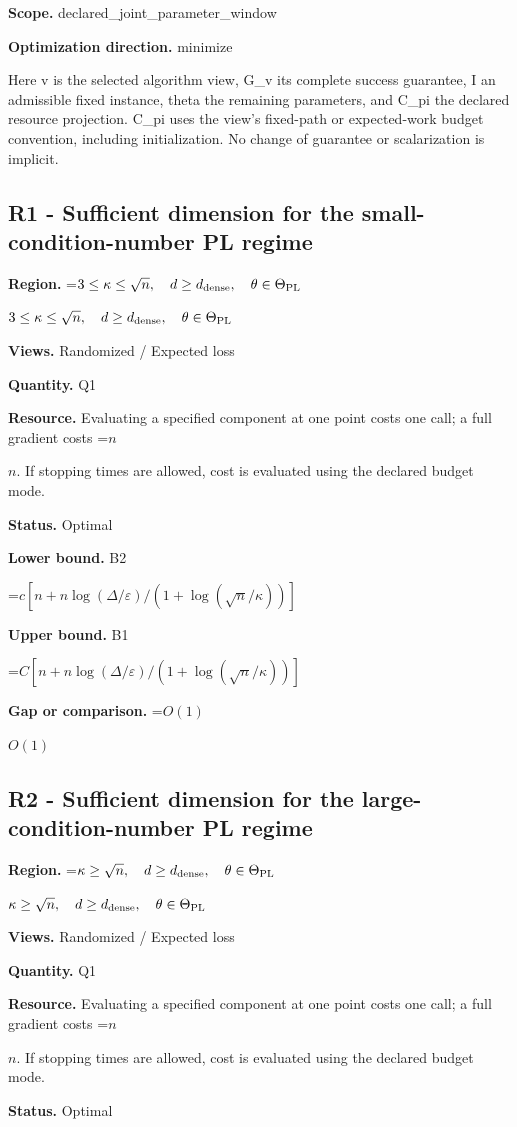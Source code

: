 \documentclass[10pt,a4paper]{article}
\newcommand{\AtlasMath}[1]{\par\begingroup\centering\setbox0=\hbox{$\displaystyle #1$}\ifdim\wd0>1.4\linewidth\typeout{ATLAS WIDE FORMULA: \the\wd0}\fi\ifdim\wd0>\linewidth\resizebox{\linewidth}{!}{\box0}\else\box0\fi\par\endgroup}
\newcommand{\AtlasInlineMath}[1]{\begingroup\setbox0=\hbox{$#1$}\ifdim\wd0>.4\linewidth\endgroup\AtlasMath{#1}\else\endgroup$#1$\fi}
\begin{document}
\textbf{Scope.} declared\_joint\_parameter\_window

\textbf{Optimization direction.} minimize

Here v is the selected algorithm view, G\_v its complete success guarantee, I an admissible fixed instance, theta the remaining parameters, and C\_pi the declared resource projection. C\_pi uses the view's fixed-path or expected-work budget convention, including initialization. No change of guarantee or scalarization is implicit.

\subsection{R1 - Sufficient dimension for the small-condition-number PL regime}
\textbf{Region.} \AtlasInlineMath{3\le\kappa\le\sqrt n,\quad d\ge d_{\rm dense},\quad\theta\in\Theta_{\rm PL}}

\textbf{Views.} Randomized / Expected loss

\textbf{Quantity.} Q1

\textbf{Resource.} Evaluating a specified component at one point costs one call; a full gradient costs \AtlasInlineMath{n}. If stopping times are allowed, cost is evaluated using the declared budget mode.

\textbf{Status.} Optimal

\textbf{Lower bound.} B2

\AtlasMath{c[n+n\log(\Delta/\varepsilon)/(1+\log(\sqrt n/\kappa))]}
\textbf{Upper bound.} B1

\AtlasMath{C[n+n\log(\Delta/\varepsilon)/(1+\log(\sqrt n/\kappa))]}
\textbf{Gap or comparison.} \AtlasInlineMath{O(1)}

\subsection{R2 - Sufficient dimension for the large-condition-number PL regime}
\textbf{Region.} \AtlasInlineMath{\kappa\ge\sqrt n,\quad d\ge d_{\rm dense},\quad\theta\in\Theta_{\rm PL}}

\textbf{Views.} Randomized / Expected loss

\textbf{Quantity.} Q1

\textbf{Resource.} Evaluating a specified component at one point costs one call; a full gradient costs \AtlasInlineMath{n}. If stopping times are allowed, cost is evaluated using the declared budget mode.

\textbf{Status.} Optimal
\end{document}
